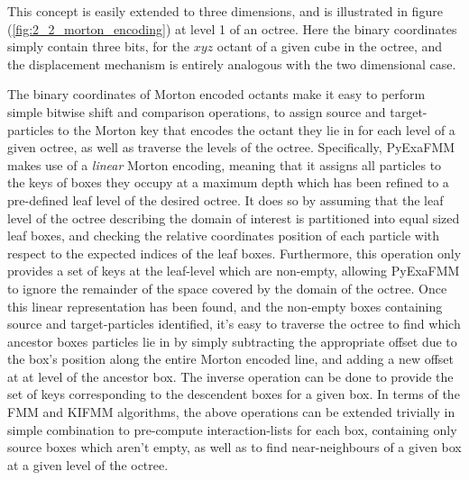 This concept is easily extended to three dimensions, and is illustrated in
figure (\ref{fig:2_2_morton_encoding}) at level 1 of an octree. Here the binary
coordinates simply contain three bits, for the $xyz$ octant of a given cube
in the octree, and the displacement mechanism is entirely analogous with the
two dimensional case.

The binary coordinates of Morton encoded octants make it easy to perform simple
bitwise shift and comparison operations, to assign source and \gls{target-particles} to the Morton key
that encodes the octant they lie in for each level of a given octree, as well as traverse the levels of
the octree. Specifically, \gls{PyExaFMM} makes use of a \textit{linear} Morton encoding, meaning that it assigns
all particles to the keys of boxes they occupy at a maximum depth which has been refined to a
pre-defined leaf level of the desired octree. It does so by assuming that the
leaf level of the octree describing the domain of interest is partitioned into equal
sized leaf boxes, and checking the relative coordinates position of each particle
with respect to the expected indices of the leaf boxes. Furthermore, this operation only provides
a set of keys at the leaf-level which are non-empty, allowing \gls{PyExaFMM} to
ignore the remainder of the space covered by the domain of the octree. Once this
linear representation has been found, and the non-empty boxes containing
source and \gls{target-particles} identified, it's easy to traverse the octree
to find which ancestor boxes particles lie in by simply subtracting the appropriate
offset due to the box's position along the entire Morton encoded line, and adding a new offset at
at level of the ancestor box. The inverse operation can be done to provide the set
of keys corresponding to the descendent boxes for a given box. In terms of the
\gls{FMM} and \gls{KIFMM} algorithms, the above operations can be extended trivially
in simple combination to pre-compute \gls{interaction-list}s for each box, containing
only source boxes which aren't empty, as well as to find \gls{near-neighbours} of
a given box at a given level of the octree.

